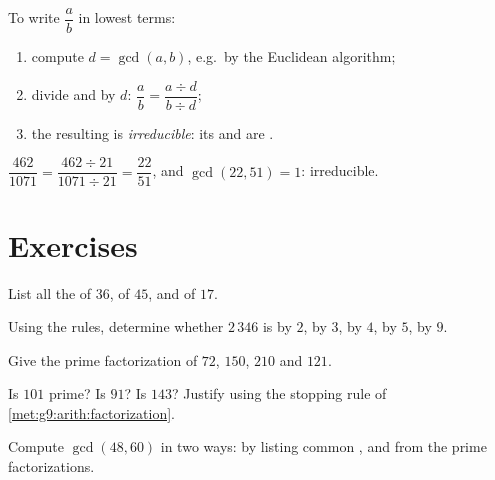 \begin{method}\label{met:g9:arith:simplify}
To write $\dfrac ab$ in lowest terms:
\begin{enumerate}
  \item compute $d = \gcd(a, b)$, e.g.\ by the Euclidean algorithm;
  \item divide  and  by $d$:
        $\dfrac ab = \dfrac{a \div d}{b \div d}$;
  \item the resulting  is \emph{irreducible}: its  and
         are .
\end{enumerate}
\end{method}

\begin{example}
$\dfrac{462}{1071} = \dfrac{462 \div 21}{1071 \div 21} = \dfrac{22}{51}$,
and $\gcd(22, 51) = 1$: irreducible.
\end{example}

\section{Exercises}

\begin{exercise}[$\star$]\label{exo:g9:arith:1}
List all the  of $36$, of $45$, and of $17$.
\end{exercise}

\begin{exercise}[$\star$]\label{exo:g9:arith:2}
Using the  rules, determine whether $2\,346$ is  by
$2$, by $3$, by $4$, by $5$, by $9$.
\end{exercise}

\begin{exercise}[$\star$]\label{exo:g9:arith:3}
Give the prime factorization of $72$, $150$, $210$ and $121$.
\end{exercise}

\begin{exercise}[$\star$]\label{exo:g9:arith:4}
Is $101$ prime? Is $91$? Is $143$? Justify using the stopping rule of
\cref{met:g9:arith:factorization}.
\end{exercise}

\begin{exercise}[$\star$]\label{exo:g9:arith:5}
Compute $\gcd(48, 60)$ in two ways: by listing common , and from
the prime factorizations.
\end{exercise}

